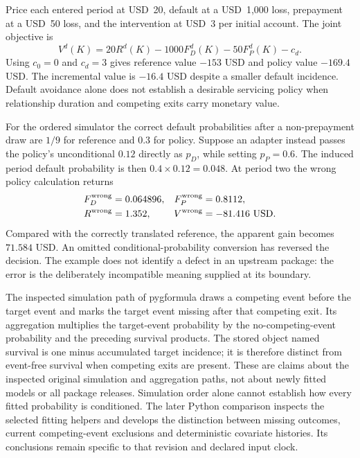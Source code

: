 Price each entered period at USD~20, default at a USD~1,000 loss, prepayment
at a USD~50 loss, and the intervention at USD~3 per initial account. The
joint objective is
\begin{equation}
 V^d(K)=20R^d(K)-1000F_D^d(K)-50F_P^d(K)-c_d.
 \label{exec17:s5-event-value}
\end{equation}
Using $c_0=0$ and $c_d=3$ gives reference value $-153$ USD and policy value
$-169.4$ USD. The incremental value is $-16.4$ USD despite a smaller default
incidence. Default avoidance alone does not establish a desirable servicing
policy when relationship duration and competing exits carry monetary value.

For the ordered simulator the correct default probabilities after a
non-prepayment draw are $1/9$ for reference and $0.3$ for policy. Suppose an
adapter instead passes the policy's unconditional $0.12$ directly as $p_D$,
while setting $p_P=0.6$. The induced period default probability is then
$0.4\times0.12=0.048$. At period two the wrong policy calculation returns
\begin{align}
 F_D^{\rm wrong}&=0.064896,&F_P^{\rm wrong}&=0.8112,\notag\\
 R^{\rm wrong}&=1.352,&V^{\rm wrong}&=-81.416\ \mathrm{USD}.
 \label{exec17:s5-ordered-error}
\end{align}
Compared with the correctly translated reference, the apparent gain becomes
$71.584$ USD. An omitted conditional-probability conversion has reversed the
decision. The example does not identify a defect in an upstream package: the
error is the deliberately incompatible meaning supplied at its boundary.
\citep{exec17_s5_math}

The inspected simulation path of pygformula draws a competing event before
the target event and marks the target event missing after that competing
exit. Its aggregation multiplies the target-event probability by the
no-competing-event probability and the preceding survival products. The
stored object named survival is one minus accumulated target incidence;
it is therefore distinct from event-free survival when competing exits are
present. These are claims about the inspected original simulation and
aggregation paths, not about newly fitted models or all package releases.
Simulation order alone cannot establish how every fitted probability
is conditioned. The later Python comparison inspects the selected fitting
helpers and develops the distinction between missing outcomes, current
competing-event exclusions and deterministic covariate histories. Its
conclusions remain specific to that revision and declared input clock.
\citep{v13_sw_pygformula,exec17_s5_paths,rel25pygfit}

